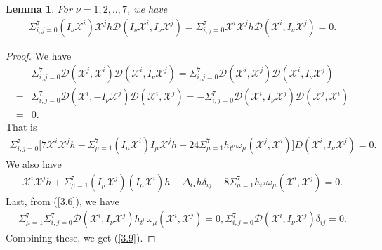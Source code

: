 \documentclass[reqno,12pt]{amsart}
\numberwithin{equation}{section}
\theoremstyle{plain}
\newtheorem{lemma}[theorem]{Lemma}
\theoremstyle{definition}
\begin{document}
\begin{lemma} \label{lemma 3.1}
For $\nu=1,2,..,7$, we have
\begin{align}\label{3.9}
        \Sigma_{i,j=0}^7(I_\nu \mathscr{X}^i )\mathscr{X}^j h \mathcal{D}(I_\nu \mathscr{X}^i,I_\nu \mathscr{X}^j)= \Sigma_{i,j=0}^7 \mathscr{X}^i \mathscr{X}^j h \mathcal{D}( \mathscr{X}^i,I_\nu \mathscr{X}^j)=0.
    \end{align}
    \end{lemma}
  \begin{proof}
    We  have
    \begin{equation*}
        \begin{aligned}
    &\Sigma_{i,j=0}^7\mathcal{D}(\mathscr{X}^j,\mathscr{X}^i)\mathcal{D}(\mathscr{X}^i,I_\nu \mathscr{X}^j)=\Sigma_{i,j=0}^7\mathcal{D}(\mathscr{X}^i,\mathscr{X}^j)\mathcal{D}(\mathscr{X}^i,I_\nu \mathscr{X}^j)\\=&\Sigma_{i,j=0}^7\mathcal{D}(\mathscr{X}^i,-I_\nu \mathscr{X}^j)\mathcal{D}(\mathscr{X}^i, \mathscr{X}^j)=-\Sigma_{i,j=0}^7\mathcal{D}(\mathscr{X}^i,I_\nu \mathscr{X}^j)\mathcal{D}(\mathscr{X}^j, \mathscr{X}^i)\\=&0.
    \end{aligned}    \end{equation*}
That is
\begin{equation}\label{3.10}
\begin{aligned}
      \Sigma_{i,j=0}^7\bigg[7\mathscr{X}^i\mathscr{X}^j h-\Sigma_{\mu=1}^7(I_\mu \mathscr{X}^i) I_\mu \mathscr{X}^j h-24\Sigma_{\mu=1}^7h_{t^\mu}\omega_\mu (\mathscr{X}^j,\mathscr{X}^i)\bigg]D(\mathscr{X}^i,I_\nu \mathscr{X}^j)=0. 
    \end{aligned}
\end{equation}
We also have
\begin{align}
\mathscr{X}^i\mathscr{X}^jh+\Sigma_{\mu=1}^7(I_\mu \mathscr{X}^j)(I_\mu \mathscr{X}^i)h-\Delta_G h \delta_{ij}+8\Sigma_{\mu=1}^7h_{t^\mu}\omega_\mu (\mathscr{X}^i,\mathscr{X}^j)=0.
\end{align}
Last, from (\ref{3.6}), we have 
\begin{align}
   \Sigma_{\mu=1}^7 \Sigma_{i,j=0}^7 \mathcal{D}(\mathscr{X}^i,I_\nu \mathscr{X}^j)h_{t^\mu}\omega_\mu (\mathscr{X}^i,\mathscr{X}^j)=0, \Sigma_{i,j=0}^7\mathcal{D}(\mathscr{X}^i, I_\nu\mathscr{X}^j)\delta_{ij}=0.\end{align}
Combining these, we get (\ref{3.9}).
 \end{proof}  
\end{document}
